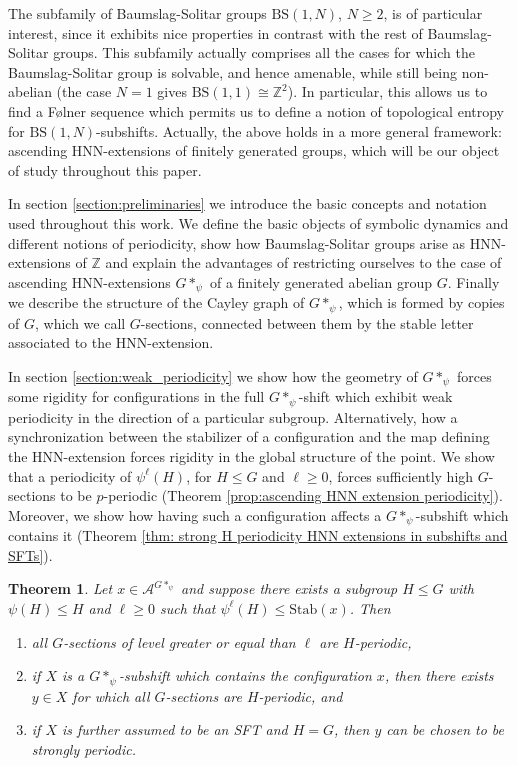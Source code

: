 \documentclass[cupthm,crop,info]{CUP-JNL-ETS}%
\theoremstyle{cupplain}
\newtheorem{theorem}{Theorem}[section]
\theoremstyle{cupdefinition}
\theoremstyle{cupremark}
\theoremstyle{cupproof}
\numberwithin{equation}{section}
\newcommand{\BS}[1][N]{\mathrm{BS}(1,#1)}
\begin{document}
The subfamily of Baumslag-Solitar groups $\BS$, $N\ge 2$, is of particular interest, since it exhibits nice properties in contrast with the rest of Baumslag-Solitar groups. This subfamily actually comprises all the cases for which the Baumslag-Solitar group is solvable, and hence amenable, while still being non-abelian (the case $N=1$ gives $\mathrm{BS}(1,1)\cong \mathbb{Z}^2$). In particular, this allows us to find a F\o lner sequence which permits us to define a notion of topological entropy for $\BS$-subshifts. Actually, the above holds in a more general framework: ascending HNN-extensions of finitely generated groups, which will be our object of study throughout this paper. 

In section \ref{section:preliminaries} we introduce the basic concepts and notation used throughout this work. We define the basic objects of symbolic dynamics and different notions of periodicity, show how Baumslag-Solitar groups arise as HNN-extensions of $\mathbb{Z}$ and explain the advantages of restricting ourselves to the case of ascending HNN-extensions $G*_{\psi}$ of a finitely generated abelian group $G$. Finally we describe the structure of the Cayley graph of $G*_{\psi}$, which is formed by copies of $G$, which we call $G$-sections, connected between them by the stable letter associated to the HNN-extension.

In section \ref{section:weak_periodicity} we show how the geometry of $G*_{\psi}$ forces some rigidity for configurations in the full $G*_{\psi}$-shift which exhibit weak periodicity in the direction of a particular subgroup. Alternatively, how a synchronization between the stabilizer of a configuration and the map defining the HNN-extension forces rigidity in the global structure of the point. We show that a periodicity of
$\psi^{\ell}(H)$, for $H\leqslant G$ and $\ell\ge 0$, forces sufficiently high $G$-sections to be $p$-periodic (Theorem \ref{prop:ascending HNN extension periodicity}). Moreover, we show how having such a configuration affects a $G*_{\psi}$-subshift which contains it (Theorem \ref{thm: strong H periodicity HNN extensions in subshifts and SFTs}).

\begin{theorem}\label{thm:summary_weak_periodicity}
	Let $x\in \mathcal{A}^{G*_{\psi}}$ and suppose there exists a subgroup $H\leqslant G$ with $\psi(H)\leqslant H$ and $\ell\ge 0$ such that $\psi^{\ell}(H)\leqslant \mathrm{Stab}(x)$. Then
	\begin{enumerate}
		\item all $G$-sections of level greater or equal than $\ell$ are $H$-periodic,
		\item if $X$ is a $G*_{\psi}$-subshift which contains the configuration $x$, then there exists $y\in X$ for which all $G$-sections are $H$-periodic, and 
		\item if $X$ is further assumed to be an SFT and $H=G$, then $y$ can be chosen to be strongly periodic.
	\end{enumerate}
\end{theorem}
\end{document}
